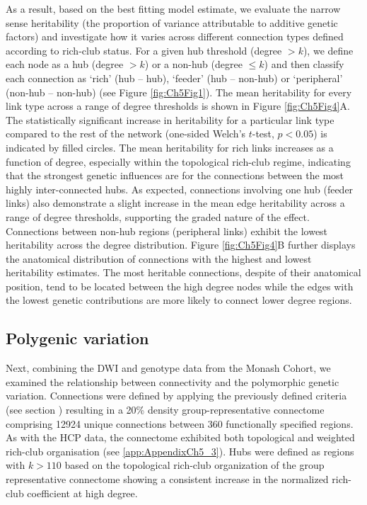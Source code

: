 As a result, based on the best fitting model estimate, we evaluate the narrow sense heritability (the proportion of variance attributable to additive genetic factors) and investigate how it varies across different connection types defined according to rich-club status. For a given hub threshold (degree $> k$), we define each node as a hub (degree $> k$) or a non-hub (degree $\leq k$) and then classify each connection as `rich' (hub -- hub), `feeder' (hub -- non-hub) or `peripheral' (non-hub -- non-hub) (see Figure \ref{fig:Ch5Fig1}). The mean heritability for every link type across a range of degree thresholds is shown in Figure \ref{fig:Ch5Fig4}A. The statistically significant increase in heritability for a particular link type compared to the rest of the network (one-sided Welch’s $t$-test, $p < 0.05$) is indicated by filled circles. The mean heritability for rich links increases as a function of degree, especially within the topological rich-club regime, indicating that the strongest genetic influences are for the connections between the most highly inter-connected hubs. As expected, connections involving one hub (feeder links) also demonstrate a slight increase in the mean edge heritability across a range of degree thresholds, supporting the graded nature of the effect. Connections between non-hub regions (peripheral links) exhibit the lowest heritability across the degree distribution. Figure \ref{fig:Ch5Fig4}B further displays the anatomical distribution of connections with the highest and lowest heritability estimates. The most heritable connections, despite of their anatomical position, tend to be located between the high degree nodes while the edges with the lowest genetic contributions are more likely to connect lower degree regions.

\subsection{Polygenic variation}

Next, combining the DWI and genotype data from the Monash Cohort, we examined the relationship between connectivity and the polymorphic genetic variation. Connections were defined by applying the previously defined criteria (see section ) resulting in a 20\% density group-representative connectome comprising \num{12924} unique connections between 360 functionally specified regions. As with the HCP data, the connectome exhibited both topological and weighted rich-club organisation (see \ref{app:AppendixCh5_3}). Hubs were defined as regions with $k > 110$ based on the topological rich-club organization of the group representative connectome showing a consistent increase in the normalized rich-club coefficient at high degree.

